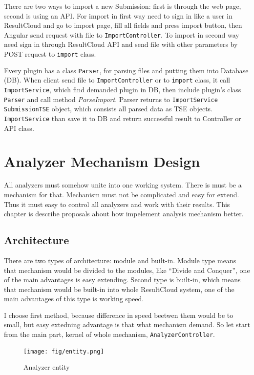 There are two ways to import a new Submission: first is through the web page, second is using an API. For import in first way need to sign in like a user in ResultCloud and go to import page, fill all fields and press import button, then Angular send request with file to \texttt{ImportController}. To import in second way need sign in through ResultCloud API and send file with other parameters by POST request to \texttt{import} class. 

Every plugin has a class \texttt{Parser}, for parsing files and putting them into Database (DB). When client send file to \texttt{ImportController} or to \texttt{import} class, it call \texttt{ImportService}, which find demanded plugin in DB, then include plugin's class \texttt{Parser} and call method \emph{ParseImport}. Parser returns to \texttt{ImportService} \texttt{SubmissionTSE} object, which consists all parsed data as TSE objects. \texttt{ImportService} than save it to DB and return successful result to Controller or API class.

\chapter{Analyzer Mechanism Design}
\label{ch:analyzer_proposal}

All analyzers must somehow unite into one working system. There is must be a mechanism for that. Mechanism must not be complicated and easy for extend. Thus it must easy to control all analyzers and work with their results. This chapter is describe proposals about how impelement analysis mechanism better.

\section{Architecture} 

There are two types of architecture: module and built-in. Module type means that mechanism would be divided to the modules, like “Divide and Conquer”, one of the main advantages is easy extending. Second type is built-in, which means that mechanism would be built-in into whole ResultCloud system, one of the main advantages of this type is working speed.

I choose first method, because difference in speed beetwen them would be to small, but easy extedning advantage is that what mechanism demand. So let start from the main part, kernel of whole mechanism, \texttt{AnalyzerController}. 

\begin{figure}
  \centering
    \texttt{[image: fig/entity.png]}
  \caption{Analyzer entity}
  \label{fig:entity}
\end{figure}

